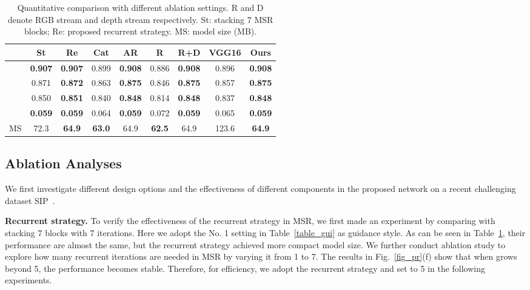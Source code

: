 \documentclass[runningheads]{llncs}
\begin{document}
\setlength{\tabcolsep}{6pt}
\begin{table}[]
\begin{center}
\caption{Quantitative comparison with different ablation settings. R and D denote RGB stream and depth stream respectively. St: stacking 7 MSR blocks; Re: proposed recurrent strategy. MS: model size (MB).}
\label{table_ablation}
\begin{tabular}{r|cc|cc|cc|cc}
\hline
\hline
          & St    & Re    & Cat   & AR    & R     & R+D   & VGG16 & Ours  \\ \hline
 & \textbf{0.907} & \textbf{0.907} & 0.899 & \textbf{0.908} & 0.886 & \textbf{0.908} & 0.896 & \textbf{0.908} \\
 & 0.871 & \textbf{0.872} & 0.863 & \textbf{0.875} & 0.846 & \textbf{0.875} & 0.857 & \textbf{0.875} \\
 & 0.850 & \textbf{0.851} & 0.840 & \textbf{0.848} & 0.814 & \textbf{0.848} & 0.837 & \textbf{0.848} \\
  & \textbf{0.059} & \textbf{0.059} & 0.064 & \textbf{0.059} & 0.072 & \textbf{0.059} & 0.065 & \textbf{0.059} \\
MS & 72.3  & \textbf{64.9}  & \textbf{63.0}  & 64.9  & \textbf{62.5} & 64.9  & 123.6 & \textbf{64.9}  \\ \hline
\hline
\end{tabular}
\end{center}
\end{table}
\setlength{\tabcolsep}{1.6pt}


\subsection{Ablation Analyses}\label{sec4.2}
We first investigate different design options and the effectiveness of different components in the proposed network on a recent challenging dataset SIP~\cite{fan2019rethinking}.

\textbf{Recurrent strategy.} To verify the effectiveness of the recurrent strategy in MSR, we first made an experiment by comparing with stacking 7 blocks with 7 iterations. Here we adopt the No. 1 setting in Table~\ref{table_gui} as guidance style. As can be seen in Table~\ref{table_ablation}, their performance are almost the same, but the recurrent strategy achieved more compact model size. We further conduct ablation study to explore how many recurrent iterations are needed in MSR by varying it  from 1 to 7. The results in Fig.~\ref{fig_pr}(f) show that when  grows beyond 5, the performance becomes stable. Therefore, for efficiency, we adopt the recurrent strategy and set  to 5 in the following experiments.
\end{document}
